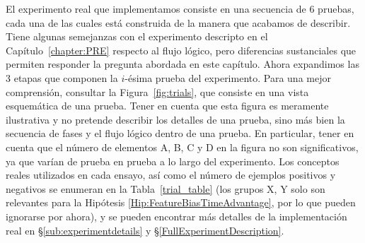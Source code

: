 El experimento real que implementamos consiste en una secuencia de 6 pruebas, cada una de las cuales está construida de la manera que acabamos de describir. Tiene algunas semejanzas con el experimento descripto en el Capítulo~\ref{chapter:PRE} respecto al flujo lógico, pero  diferencias sustanciales que permiten responder la pregunta abordada en este capítulo. Ahora expandimos las 3 etapas que componen la $i$-ésima prueba del experimento. Para una mejor comprensión, consultar la Figura~\ref{fig:trials}, que consiste en una vista esquemática de una prueba. Tener en cuenta que esta figura es meramente ilustrativa y no pretende describir los detalles de una prueba, sino más bien la secuencia de fases y el flujo lógico dentro de una prueba. En particular, tener en cuenta que el número de elementos {\sf A}, {\sf B}, {\sf C} y {\sf D} en la figura no son significativos, ya que varían de prueba en prueba a lo largo del experimento. Los conceptos reales utilizados en cada ensayo, así como el número de ejemplos positivos y negativos se enumeran en la Tabla~\ref{trial_table} (los grupos X, Y solo son relevantes para la Hipótesis \ref{Hip:FeatureBiasTimeAdvantage}, por lo que pueden ignorarse por ahora), y se pueden encontrar más detalles de la implementación real en \S\ref{sub:experimentdetails} y \S\ref{FullExperimentDescription}.  
%
